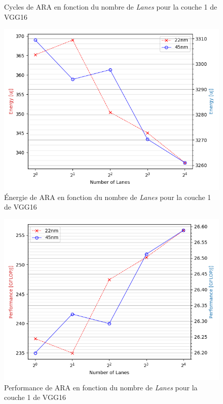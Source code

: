\documentclass[11pt,letterpaper]{article}
\begin{document}
\begin{multicols}{2}
\begin{figure}[H]
        \caption{Cycles de ARA en fonction du nombre de \textit{Lanes} pour la couche 1 de VGG16}
        \label{fig:cycles}
    \end{figure}
    \begin{figure}[H]
        \centering
        \includegraphics[width=\linewidth]{energy.png}
        \caption{Énergie de ARA en fonction du nombre de \textit{Lanes} pour la couche 1 de VGG16}
        \label{fig:energy}
    \end{figure}
    \begin{figure}[H]
        \centering
        \includegraphics[width=\linewidth]{performance.png}
        \caption{Performance de ARA en fonction du nombre de \textit{Lanes} pour la couche 1 de VGG16}

\end{figure}
\end{multicols}
\end{document}

